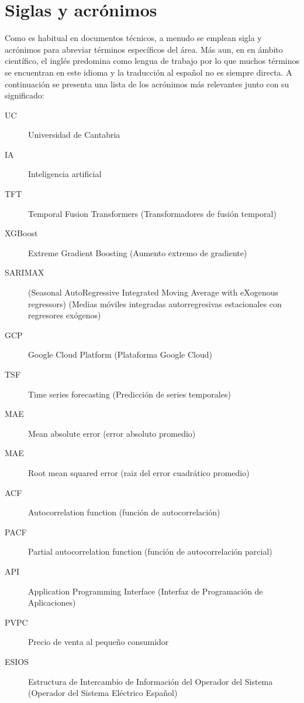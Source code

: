 \clearpage
\hypersetup{linkcolor=black}
\tableofcontents\clearpage
\hypersetup{linkcolor=linkscolor}

\chapter*{Siglas y acrónimos}
%
%
Como es habitual en documentos técnicos, a menudo se emplean sigla y acrónimos para abreviar términos específicos del área. Más aun, en en ámbito científico, el inglés predomina como lengua de trabajo por lo que muchos términos se encuentran en este idioma y la traducción al español no es siempre directa. A continuación se presenta una lista de los acrónimos más relevantes junto con su significado:
%
%
\begin{description}
    \item[UC] Universidad de Cantabria
    \item[IA] Inteligencia artificial
    \item[TFT]  Temporal Fusion Transformers (Transformadores de fusión temporal)
    \item[XGBoost] Extreme Gradient Boosting (Aumento extremo de gradiente)
    \item[SARIMAX] (Seasonal AutoRegressive Integrated Moving Average with eXogenous regressors) (Medias móviles integradas autorregresivas estacionales con regresores exógenos)
    \item[GCP] Google Cloud Platform (Plataforma Google Cloud)
    \item[TSF] Time series forecasting (Predicción de series temporales)
    \item[MAE] Mean absolute error (error absoluto promedio)
    \item[MAE] Root mean squared error (raiz del error cuadrático promedio)
    \item[ACF] Autocorrelation function (función de autocorrelación)
    \item[PACF] Partial autocorrelation function (función de autocorrelación parcial)
    \item[API] Application Programming Interface (Interfaz de Programación de Aplicaciones)
    \item[PVPC] Precio de venta al pequeño consumidor 
    \item[ESIOS] Estructura de Intercambio de Información del Operador del Sistema (Operador del Sistema Eléctrico Español)  
\end{description}


